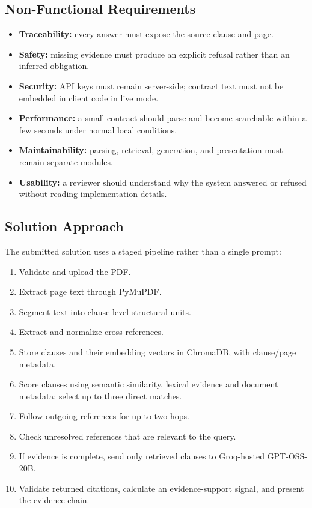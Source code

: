 \documentclass[12pt,a4paper,oneside]{report}
\begin{document}
\subsection{Non-Functional Requirements}
\begin{itemize}
  \item \textbf{Traceability:} every answer must expose the source clause and page.
  \item \textbf{Safety:} missing evidence must produce an explicit refusal rather than an inferred obligation.
  \item \textbf{Security:} API keys must remain server-side; contract text must not be embedded in client code in live mode.
  \item \textbf{Performance:} a small contract should parse and become searchable within a few seconds under normal local conditions.
  \item \textbf{Maintainability:} parsing, retrieval, generation, and presentation must remain separate modules.
  \item \textbf{Usability:} a reviewer should understand why the system answered or refused without reading implementation details.
\end{itemize}

\subsection{Solution Approach}
The submitted solution uses a staged pipeline rather than a single prompt:

\begin{enumerate}
  \item Validate and upload the PDF.
  \item Extract page text through PyMuPDF.
  \item Segment text into clause-level structural units.
  \item Extract and normalize cross-references.
  \item Store clauses and their embedding vectors in ChromaDB, with clause/page metadata.
  \item Score clauses using semantic similarity, lexical evidence and document metadata; select up to three direct matches.
  \item Follow outgoing references for up to two hops.
  \item Check unresolved references that are relevant to the query.
  \item If evidence is complete, send only retrieved clauses to Groq-hosted GPT-OSS-20B.
  \item Validate returned citations, calculate an evidence-support signal, and present the evidence chain.
\end{enumerate}
\end{document}
